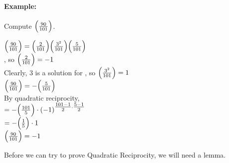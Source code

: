 \documentclass[../main.tex]{subfiles}
\begin{document}
\paragraph{Example:} Compute $\Big(\frac{90}{101}\Big)$. \\
\begin{center}
    $\Big(\frac{90}{101}\Big)=\Big(\frac{2}{101}\Big)\Big(\frac{3^2}{101}\Big)\Big(\frac{5}{101}\Big)$ \\
    , so $\Big(\frac{2}{101}\Big)=-1$ \\
    Clearly, 3 is a solution for , so $\Big(\frac{3^2}{101}\Big)=1$ \\
    $\Big(\frac{90}{101}\Big)=-\Big(\frac{5}{101}\Big)$ \\
    By quadratic reciprocity, \\
    $=-\Big(\frac{101}{5}\Big)\cdot(-1)^{\tfrac{101-1}{2}\cdot \tfrac{5-1}{2}}$ \\
    $=-\Big(\frac{1}{5}\Big)\cdot1$ \\
    $\Big(\frac{90}{101}\Big)=-1$
\end{center}
Before we can try to prove Quadratic Reciprocity, we will need a lemma.
\end{document}
